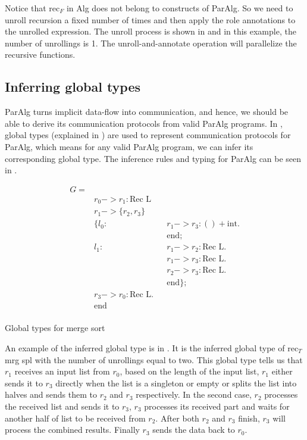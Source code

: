 Notice that $\text{rec}_F$ in Alg does not belong to constructs of ParAlg. So we need to unroll recursion a fixed number of times and then apply the role annotations to the unrolled expression. The unroll process is shown in  and in this example, the number of unrollings is 1. The unroll-and-annotate operation will parallelize the recursive functions.
\subsection{Inferring global types}
ParAlg turns implicit data-flow into communication, and hence, we should be able to derive its communication protocols from valid ParAlg programs. In \cite{AlgebraicMultipartyProtocol}, global types (explained in ) are used to represent communication protocols for ParAlg, which means for any valid ParAlg program, we can infer its corresponding global type. The inference rules and typing for ParAlg can be seen in \cite{AlgebraicMultipartyProtocol}. 
\begin{listing}[ht]
    \begin{align*}
       G = \\ 
       & r_0 -> r_1: \text{Rec L} \\
       & r_1 -> \{r_2, r_3\}\\
       & \{ l_0 : && r_1 -> r_3 : () + \text{int}.\\
       & && \text{end};\\
       &  l_1 : && r_1 -> r_2 : \text{Rec L}.\\
       &           && r_1 -> r_3 : \text{Rec L}.\\
       &           && r_2 -> r_3 : \text{Rec L}.\\
       &           && \text{end} \}; \\
       & r_3 -> r_0 : \text{Rec L}.\\
       & \text{end}\\
    \end{align*}
    \caption{Global types for merge sort}
    \label{project:code:ms2}
\end{listing}

An example of the inferred global type is in . It is the inferred global type of $\text{rec}_T$ mrg spl with the number of unrollings equal to two. This global type tells us that $r_1$ receives an input list from $r_0$, based on the length of the input list, $r_1$ either sends it to $r_3$ directly when the list is a singleton or empty or splits the list into halves and sends them to $r_2$ and $r_3$ respectively. In the second case, $r_2$ processes the received list and sends it to $r_3$, $r_3$ processes its received part and waits for another half of list to be received from $r_2$. After both $r_2$ and $r_3$ finish, $r_3$ will process the combined results. Finally $r_3$ sends the data back to $r_0$.

